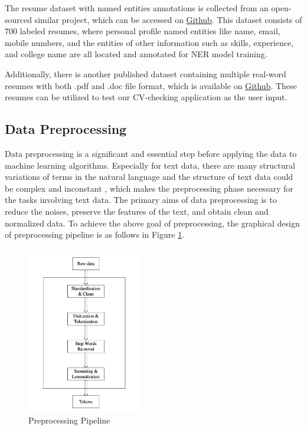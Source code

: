 The resume dataset with named entities annotations is collected from an open-sourced similar project, which can be accessed on \href{https://github.com/OmkarPathak/pyresparser}{Github}. This dataset consists of 700 labeled resumes, where personal profile named entities like name, email, mobile numbers, and the entities of other information such as skills, experience, and college name are all located and annotated for NER model training.

Additionally, there is another published dataset containing multiple real-word resumes with both .pdf and .doc file format, which is available on \href{https://github.com/Msq-9/Extraction-of-Skills}{Github}. These resumes can be utilized to test our CV-checking application as the user input.

\subsection{Data Preprocessing}

Data preprocessing is a significant and essential step before applying the data to machine learning algorithms. Especially for text data, there are many structural variations of terms in the natural language and the structure of text data could be complex and inconstant \cite{kannan2014preprocessing}, which makes the preprocessing phase necessary for the tasks involving text data. The primary aims of data preprocessing is to reduce the noises, preserve the features of the text, and obtain clean and normalized data. To achieve the above goal of preprocessing, the graphical design of preprocessing pipeline is as follows in Figure \ref{fig:15}.

 \begin{figure}[H]
    \centering
    \includegraphics[width=0.45\textwidth]{images/preprocessing.png}
    \caption{Preprocessing Pipeline}
    \label{fig:15}
\end{figure}

